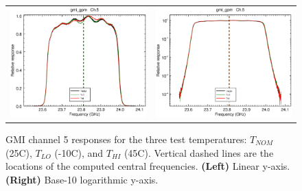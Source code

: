 \begin{figure}[htp]
  \centering
  \begin{tabular}{c c}
    \includegraphics[scale=0.3]{graphics/lin/gmi_gpm-5.eps} &
    \includegraphics[scale=0.3]{graphics/log/gmi_gpm-5.eps}
  \end{tabular}
  \caption{GMI channel 5 responses for the three test temperatures: $T_{NOM}$ (25\textdegree{}C), $T_{LO}$ (-10\textdegree{}C), and $T_{HI}$ (45\textdegree{}C). Vertical dashed lines are the locations of the computed central frequencies. \textbf{(Left)} Linear y-axis. \textbf{(Right)} Base-10 logarithmic y-axis.}
  \label{fig:ch5_response}
\end{figure}


